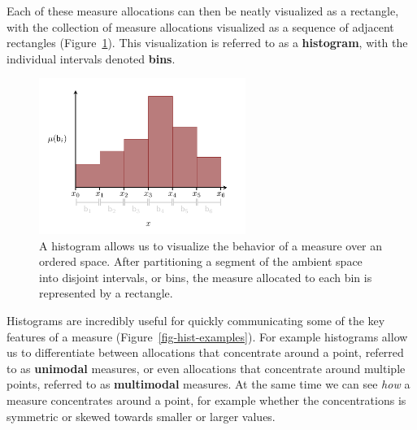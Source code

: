 \documentclass[
  letterpaper,
  DIV=11,
  numbers=noendperiod]{scrartcl}
\begin{document}
Each of these measure allocations can then be neatly visualized as a
rectangle, with the collection of measure allocations visualized as a
sequence of adjacent rectangles (Figure~\ref{fig-histogram-basics}).
This visualization is referred to as a \textbf{histogram}, with the
individual intervals denoted \textbf{bins}.

\begin{figure}

{\centering \includegraphics[width=0.6\textwidth,height=\textheight]{figures/histograms/histogram/histogram.pdf}

}

\caption{\label{fig-histogram-basics}A histogram allows us to visualize
the behavior of a measure over an ordered space. After partitioning a
segment of the ambient space into disjoint intervals, or bins, the
measure allocated to each bin is represented by a rectangle.}

\end{figure}

Histograms are incredibly useful for quickly communicating some of the
key features of a measure (Figure~\ref{fig-hist-examples}). For example
histograms allow us to differentiate between allocations that
concentrate around a point, referred to as \textbf{unimodal} measures,
or even allocations that concentrate around multiple points, referred to
as \textbf{multimodal} measures. At the same time we can see \emph{how}
a measure concentrates around a point, for example whether the
concentrations is symmetric or skewed towards smaller or larger values.
\end{document}
